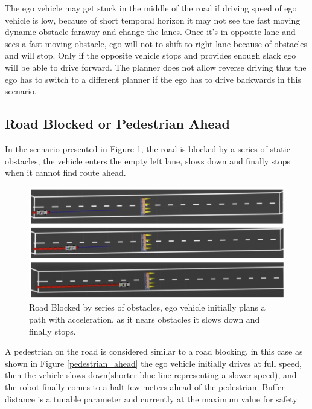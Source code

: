 The ego vehicle may get stuck in the middle of the road if driving speed of ego vehicle is low, because of short temporal horizon it may not see the fast moving dynamic obstacle faraway and change the lanes. Once it's in opposite lane and sees a fast moving obstacle, ego will not to shift to right lane because of obstacles and will stop. Only if the opposite vehicle stops and provides enough slack ego will be able to drive forward. The planner does not allow reverse driving thus the ego has to switch to a different planner if the ego has to drive backwards in this scenario. 


\subsection{Road Blocked or Pedestrian Ahead}

In the scenario presented in Figure \ref{road_blocked}, the road is blocked by a series of static obstacles, the vehicle enters the empty left lane, slows down and finally stops when it cannot find route ahead. 

\begin{figure}
    \centering
    \includegraphics[width=1.0\textwidth]{Images/evaluation/stopping_lane_blocked.jpg}
    \caption{Road Blocked by series of obstacles, ego vehicle initially plans a path with acceleration, as it nears obstacles it slows down and finally stops.}
    \label{road_blocked}
\end{figure}

A pedestrian on the road is considered similar to a road blocking, in this case as shown in Figure \ref{pedestrian_ahead} the ego vehicle initially drives at full speed, then the vehicle slows down(shorter blue line representing a slower speed), and the robot finally comes to a halt few meters ahead of the pedestrian. Buffer distance is a tunable parameter and currently at the maximum value for safety. 

